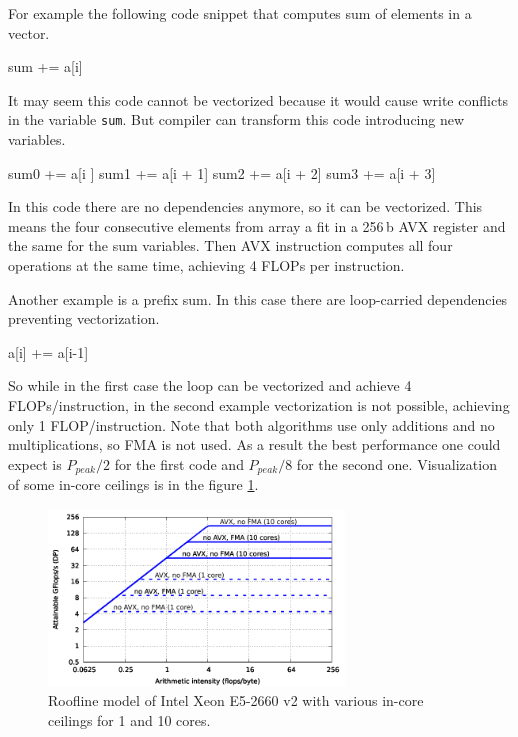 For example the following code snippet that computes sum of elements in a vector.
\begin{algorithmic}[1]
      \State sum += a[i]
  \EndFor
\end{algorithmic}%
It may seem this code cannot be vectorized because it would cause write conflicts in the variable \texttt{sum}.
But compiler can transform this code introducing new variables.
\begin{algorithmic}[1]
      \State sum0 += a[i    ]
      \State sum1 += a[i + 1]
      \State sum2 += a[i + 2]
      \State sum3 += a[i + 3]
  \EndFor
\end{algorithmic}%
In this code there are no dependencies anymore, so it can be vectorized.
This means the four consecutive elements from array a fit in a 256\,b AVX register and the same for the sum variables. Then AVX instruction computes all four operations at the same time, achieving 4 FLOPs per instruction.

Another example is a prefix sum.
In this case there are loop-carried dependencies preventing vectorization.
\begin{algorithmic}[1]
      \State a[i] += a[i-1]
  \EndFor
\end{algorithmic}%

So while in the first case the loop can be vectorized and achieve 4 FLOPs/instruction, in the second example vectorization is not possible, achieving only 1 FLOP/instruction.
Note that both algorithms use only additions and no multiplications, so FMA is not used. As a result the best performance one could expect is $P_{peak}/2$ for the first code and $P_{peak}/8$ for the second one.
Visualization of some in-core ceilings is in the figure \ref{fig:roofline_emmy_core-ceilings}. 

\begin{figure}[ht]
   \centering
   \includegraphics[width=0.7\textwidth,clip=true]{images/roofline/roofline_emmy_Xeon2660v2_core-ceilings.pdf}
   \caption{Roofline model of Intel Xeon E5-2660 v2 with various in-core ceilings for 1 and 10 cores.}
  \label{fig:roofline_emmy_core-ceilings}
\end{figure}

